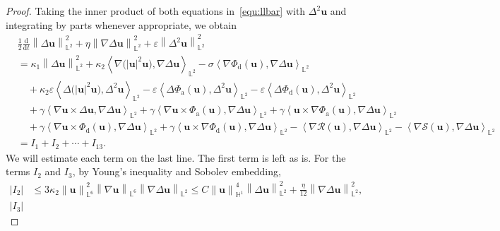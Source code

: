 \documentclass[11pt, reqno]{amsart}
\theoremstyle{definition}
\numberwithin{equation}{section}
\newcommand{\bff}{\boldsymbol}
\newcommand{\bb}{\mathbb}
\newcommand{\ddt}{\frac{\mathrm{d}}{\mathrm{d}t}}
\newcommand{\norm}[2]{\left\|{#1}\right\|_{#2}}
\newcommand{\inpro}[2]{\left\langle#1,#2\right\rangle}
\newcommand{\abs}[1]{\left|{#1}\right|}
\begin{document}
\begin{proof}
Taking the inner product of both equations in~\eqref{equ:llbar} with $\Delta^2 \bff{u}$ and integrating by parts whenever appropriate, we obtain
\begin{align}\label{equ:I1I2 I12}
    &\frac12 \ddt \norm{\Delta \bff{u}}{\bb{L}^2}^2
    +
    \eta \norm{\nabla \Delta \bff{u}}{\bb{L}^2}^2
    +
    \varepsilon \norm{\Delta^2 \bff{u}}{\bb{L}^2}^2
    \nonumber \\
    &=
    \kappa_1 \norm{\Delta \bff{u}}{\bb{L}^2}^2
    +
    \kappa_2 \inpro{\nabla\big(|\bff{u}|^2 \bff{u}\big)}{\nabla \Delta \bff{u}}_{\bb{L}^2}
    -
    \sigma \inpro{\nabla \Phi_{\mathrm{d}} (\bff{u})}{\nabla\Delta \bff{u}}_{\bb{L}^2}
    \nonumber \\
    &\quad
    +
    \kappa_2 \varepsilon \inpro{\Delta\big(|\bff{u}|^2 \bff{u}\big)}{\Delta^2 \bff{u}}_{\bb{L}^2}
    -
    \varepsilon \inpro{\Delta \Phi_{\mathrm{a}}(\bff{u})}{\Delta^2 \bff{u}}_{\bb{L}^2}
    -
    \varepsilon \inpro{\Delta \Phi_{\mathrm{d}}(\bff{u})}{\Delta^2 \bff{u}}_{\bb{L}^2}
    \nonumber \\
    &\quad
    +
    \gamma \inpro{\nabla \bff{u}\times \Delta \bff{u}}{\nabla \Delta \bff{u}}_{\bb{L}^2}
    +
    \gamma \inpro{\nabla \bff{u} \times \Phi_{\mathrm{a}}(\bff{u})}{\nabla \Delta \bff{u}}_{\bb{L}^2}
    +
    \gamma \inpro{\bff{u} \times \nabla \Phi_{\mathrm{a}}(\bff{u})}{\nabla \Delta \bff{u}}_{\bb{L}^2}
    \nonumber \\
    &\quad
    +
    \gamma \inpro{\nabla\bff{u}\times \Phi_{\mathrm{d}}(\bff{u})}{\nabla\Delta \bff{u}}_{\bb{L}^2}
    +
    \gamma \inpro{\bff{u}\times \nabla\Phi_{\mathrm{d}}(\bff{u})}{\nabla\Delta \bff{u}}_{\bb{L}^2}
    -
    \inpro{\nabla \mathcal{R}(\bff{u})}{\nabla \Delta \bff{u}}_{\bb{L}^2}
    -
    \inpro{\nabla \mathcal{S}(\bff{u})}{\nabla \Delta \bff{u}}_{\bb{L}^2}
    \nonumber \\
    &=
    I_1+I_2+\cdots+ I_{13}.
\end{align}
We will estimate each term on the last line. The first term is left as is. For the terms $I_2$ and $I_3$, by Young's inequality and Sobolev embedding,
\begin{align*}
    \abs{I_2}
    &\leq
    3\kappa_2 \norm{\bff{u}}{\bb{L}^6}^2 \norm{\nabla \bff{u}}{\bb{L}^6} \norm{\nabla \Delta \bff{u}}{\bb{L}^2}
    \leq
    C\norm{\bff{u}}{\bb{H}^1}^4 \norm{\Delta \bff{u}}{\bb{L}^2}^2
    +
    \frac{\eta}{12} \norm{\nabla\Delta \bff{u}}{\bb{L}^2}^2,
    \\
    \abs{I_3}

\end{align*}
\end{proof}
\end{document}
